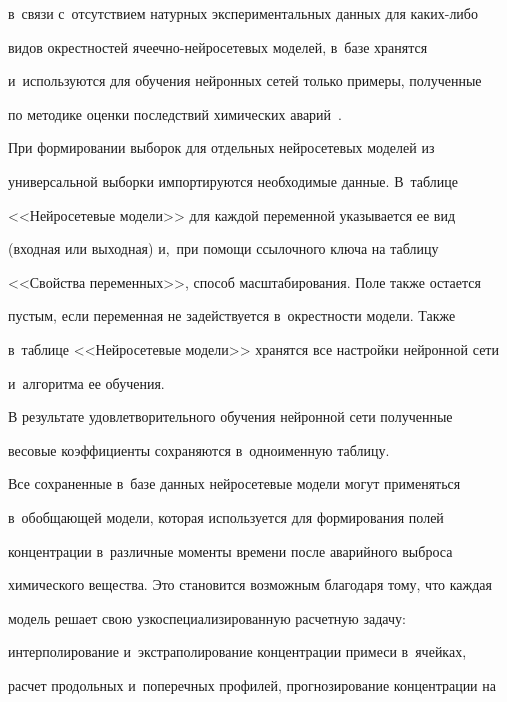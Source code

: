 в~связи с~отсутствием натурных экспериментальных данных для ка\-ких-ли\-бо 


видов окрестностей яче\-еч\-но-ней\-ро\-се\-те\-вых моделей, в~базе хранятся 


и~используются для обучения нейронных сетей только примеры, полученные 


по методике оценки последствий химических аварий~\cite{5-dud}.


  


  При формировании выборок для отдельных нейросетевых моделей из 


универсальной выборки импортируются необходимые данные. В~таб\-ли\-це 


<<Нейросетевые модели>> для каждой переменной указывается ее вид 


(входная или выходная) и,~при помощи ссылочного ключа на таб\-ли\-цу 


<<Свойства переменных>>, способ масштабирования. Поле также остается 


пустым, если переменная не задействуется в~окрестности модели. Также 


в~таб\-ли\-це <<Нейросетевые модели>> хранятся все настройки нейронной сети 


и~алгоритма ее обучения.


  


  В результате удовлетворительного обучения нейронной сети полученные 


весовые коэффициенты сохраняются в~одноименную таб\-лицу.








  


  Все сохраненные в~базе данных нейросетевые модели могут применяться 


в~обобщающей модели, которая используется для формирования полей 


концентрации в~различные моменты времени после аварийного выброса 


химического вещества. Это становится возможным благодаря тому, что каждая 


модель решает свою узкоспециализированную расчетную задачу: 


интерполирование и~экстраполирование концентрации примеси в~ячейках, 


расчет продольных и~поперечных профилей, прогнозирование концентрации на 


